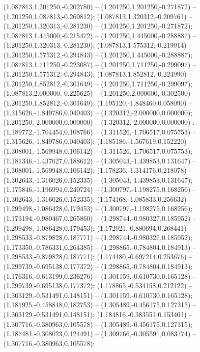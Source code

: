  (1.087813,1.201250,-0.202780) -- (1.201250,1.201250,-0.271872) -- (1.201250,1.087813,-0.260812);
 (1.087813,1.320312,-0.209761) -- (1.201250,1.320313,-0.281230) -- (1.201250,1.201250,-0.271872);
 (1.087813,1.445000,-0.215472) -- (1.201250,1.445000,-0.288887) -- (1.201250,1.320313,-0.281230);
 (1.087813,1.575312,-0.219914) -- (1.201250,1.575312,-0.294843) -- (1.201250,1.445000,-0.288887);
 (1.087813,1.711250,-0.223087) -- (1.201250,1.711250,-0.299097) -- (1.201250,1.575312,-0.294843);
 (1.087813,1.852812,-0.224990) -- (1.201250,1.852812,-0.301649) -- (1.201250,1.711250,-0.299097);
 (1.087813,2.000000,-0.225625) -- (1.201250,2.000000,-0.302500) -- (1.201250,1.852812,-0.301649);
 (1.195120,-1.848460,0.058090) -- (1.315626,-1.849786,0.040403) -- (1.320312,-2.000000,0.000000);
 (1.201250,-2.000000,0.000000) -- (1.320312,-2.000000,0.000000) ;
 (1.189772,-1.704454,0.108766) -- (1.311526,-1.706517,0.075753) -- (1.315626,-1.849786,0.040403);
 (1.185186,-1.567619,0.152220) -- (1.308001,-1.569948,0.106142) -- (1.311526,-1.706517,0.075753);
 (1.181346,-1.437627,0.188612) -- (1.305043,-1.439853,0.131647) -- (1.308001,-1.569948,0.106142);
 (1.178236,-1.314176,0.218078) -- (1.302643,-1.316026,0.152335) -- (1.305043,-1.439853,0.131647);
 (1.175846,-1.196994,0.240724) -- (1.300797,-1.198275,0.168256) -- (1.302643,-1.316026,0.152335);
 (1.174168,-1.085833,0.256632) -- (1.299498,-1.086428,0.179453) -- (1.300797,-1.198275,0.168256);
 (1.173194,-0.980467,0.265860) -- (1.298744,-0.980327,0.185952) -- (1.299498,-1.086428,0.179453);
 (1.172921,-0.880694,0.268441) -- (1.298533,-0.879828,0.187771) -- (1.298744,-0.980327,0.185952);
 (1.173350,-0.786331,0.264385) -- (1.298865,-0.784804,0.184913) -- (1.298533,-0.879828,0.187771);
 (1.174480,-0.697214,0.253676) -- (1.299739,-0.695138,0.177372) -- (1.298865,-0.784804,0.184913);
 (1.176316,-0.613199,0.236276) -- (1.301159,-0.610730,0.165128) -- (1.299739,-0.695138,0.177372);
 (1.178865,-0.534158,0.212122) -- (1.303129,-0.531491,0.148151) -- (1.301159,-0.610730,0.165128);
 (1.181925,-0.458848,0.182753) -- (1.305489,-0.456175,0.127315) -- (1.303129,-0.531491,0.148151);
 (1.184816,-0.383551,0.153401) -- (1.307716,-0.380963,0.105578) -- (1.305489,-0.456175,0.127315);
 (1.187481,-0.308023,0.124491) -- (1.309766,-0.305591,0.083174) -- (1.307716,-0.380963,0.105578);

